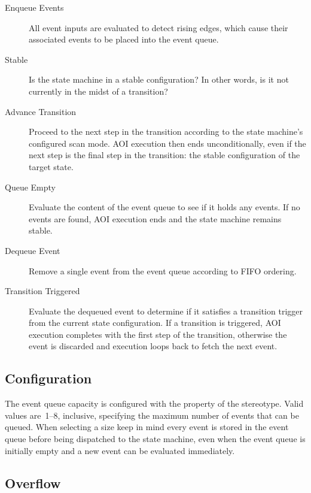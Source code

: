 \begin{description}
  \item[Enqueue Events] All event inputs are evaluated to detect rising
    edges, which cause their associated events to be placed into the
    event queue.

  \item[Stable] Is the state machine in a stable configuration? In other
    words, is it not currently in the midst of a transition?

  \item[Advance Transition] Proceed to the next step in the
    transition according to the state machine's configured scan mode.
    AOI execution then ends unconditionally, even if the next step is the
    final step in the transition: the stable configuration of the
    target state.

  \item[Queue Empty] Evaluate the content of the event queue to see if it
    holds any events. If no events are found, AOI execution ends and the
    state machine remains stable.

  \item[Dequeue Event] Remove a single event from the event queue according
    to FIFO ordering.

  \item[Transition Triggered] Evaluate the dequeued event to determine if it
    satisfies a transition trigger from the current state configuration.
    If a transition is triggered, AOI execution completes with the
    first step of the transition, otherwise the event is discarded and
    execution loops back to fetch the next event.
\end{description}




\subsection{Configuration}

The event queue capacity is configured with the
 property of the
\identifier{\stereotypeName} stereotype. Valid values are~1--8,
inclusive, specifying the maximum number of events that can be queued.
When selecting a size keep in mind every event is stored in
the event queue before being dispatched to the state machine,
even when the event queue is initially empty and a new event can be
evaluated immediately.


\subsection{Overflow}


